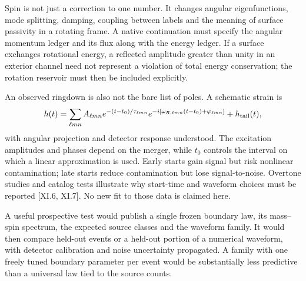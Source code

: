 Spin is not just a correction to one number. It changes angular eigenfunctions, mode splitting, damping, coupling between labels and the meaning of surface passivity in a rotating frame. A native continuation must specify the angular momentum ledger and its flux along with the energy ledger. If a surface exchanges rotational energy, a reflected amplitude greater than unity in an exterior channel need not represent a violation of total energy conservation; the rotation reservoir must then be included explicitly.

An observed ringdown is also not the bare list of poles. A schematic strain is
\begin{equation}
 h(t)=\sum_{\ell mn}A_{\ell mn}
 e^{-(t-t_0)/\tau_{\ell mn}}
 e^{-i[\omega_{R,\ell mn}(t-t_0)+\varphi_{\ell mn}]}
 +h_{\rm tail}(t),
 \label{c11:waveform}
\end{equation}
with angular projection and detector response understood. The excitation amplitudes and phases depend on the merger, while $t_0$ controls the interval on which a linear approximation is used. Early starts gain signal but risk nonlinear contamination; late starts reduce contamination but lose signal-to-noise. Overtone studies and catalog tests illustrate why start-time and waveform choices must be reported [XI.6, XI.7]. No new fit to those data is claimed here.

A useful prospective test would publish a single frozen boundary law, its mass--spin spectrum, the expected source classes and the waveform family. It would then compare held-out events or a held-out portion of a numerical waveform, with detector calibration and noise uncertainty propagated. A family with one freely tuned boundary parameter per event would be substantially less predictive than a universal law tied to the source counts.

